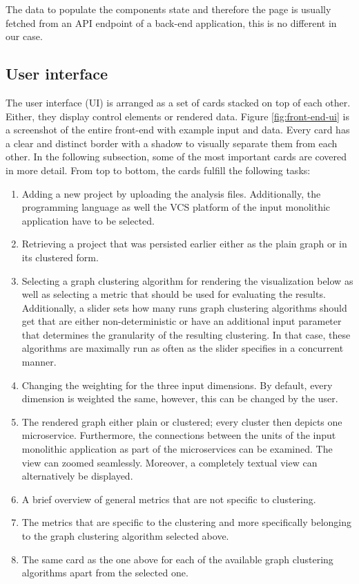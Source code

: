 \documentclass[12pt,a4paper]{report}
\begin{document}
The data to populate the components state and therefore the page is usually
fetched from an API endpoint of a back-end application, this is no different
in our case.


\subsection{User interface}

The user interface (UI) is arranged as a set of cards stacked on top of each
other. Either, they display control elements or rendered data.
Figure \ref{fig:front-end-ui} is a screenshot of the entire front-end with
example input and data. Every card has a clear and distinct border with
a shadow to visually separate them from each other.
In the following subsection, some of the most important cards are covered
in more detail. From top to bottom, the cards fulfill the following tasks:

\begin{enumerate}
  \item Adding a new project by uploading the analysis files. Additionally,
        the programming language as well the VCS platform of the input
        monolithic application have to be selected.
  \item Retrieving a project that was persisted earlier either as the plain
        graph or in its clustered form.
  \item Selecting a graph clustering algorithm for rendering the visualization
        below as well as selecting a metric that should be used for evaluating
        the results. Additionally, a slider sets how many runs graph clustering
        algorithms should get that are either non-deterministic or have an
        additional input parameter that determines the granularity of the
        resulting clustering. In that case, these algorithms are maximally run
        as often as the slider specifies in a concurrent manner.
  \item Changing the weighting for the three input dimensions. By default,
        every dimension is weighted the same, however, this can be changed by
        the user.
  \item The rendered graph either plain or clustered; every cluster then depicts
        one microservice. Furthermore, the connections between the units of the
        input monolithic application as part of the microservices can be
        examined. The view can zoomed seamlessly.
        Moreover, a completely textual view can alternatively be displayed.
  \item A brief overview of general metrics that are not specific to clustering.
  \item The metrics that are specific to the clustering and more specifically
        belonging to the graph clustering algorithm selected above.
  \item The same card as the one above for each of the available
        graph clustering algorithms apart from the selected one.
\end{enumerate}
\end{document}
